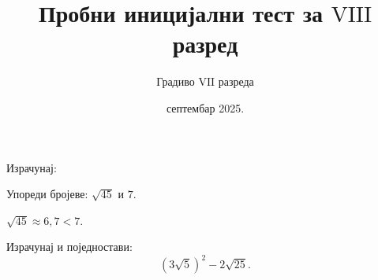 \documentclass[11pt,a5paper,twoside,addpoints,noanswers]{exam} %
\title{Пробни иницијални тест за $\mathrm{VIII}$ разред}
\author{Градиво $\mathrm{VII}$ разреда}
\date{септембар 2025.}
\begin{document}
\maketitle
\thispagestyle{headandfoot}

\ifprintanswers\else
\begin{flushleft}
\gradetable[v]\newpage
\end{flushleft}
\fi

\begin{questions}

\question[6]
Израчунај:
\begin{multicols}{3}
\end{multicols}

\begin{solution}[\stretch 1]
\end{solution}

\question[6]
Упореди бројеве: $\sqrt{45}$ и $7$.

\begin{solution}[\stretch 1]
$\sqrt{45}\approx 6{,}7 < 7$.
\end{solution}

\ifprintanswers\else\newpage\fi

\question[6]
Израчунај и поједностави:
\[
(3\sqrt{5})^2 - 2\sqrt{25}.
\]


\end{questions}
\end{document}
